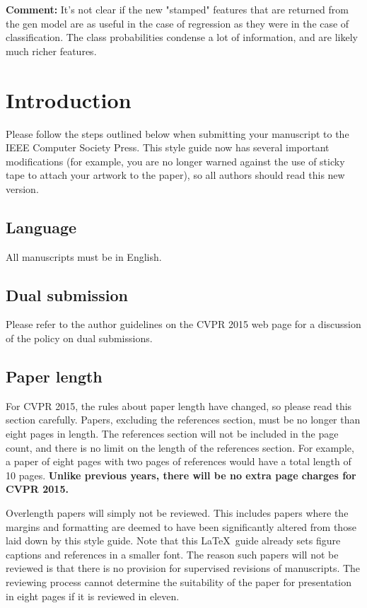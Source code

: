 \documentclass[10pt,twocolumn,letterpaper]{article}
\begin{document}
\textbf{Comment:} It's not clear if the new "stamped" features that are returned from the gen model are as useful in the case of regression as they were in the case of classification.  The class probabilities condense a lot of information, and are likely much richer features.









\section{Introduction}

Please follow the steps outlined below when submitting your manuscript to
the IEEE Computer Society Press.  This style guide now has several
important modifications (for example, you are no longer warned against the
use of sticky tape to attach your artwork to the paper), so all authors
should read this new version.

\subsection{Language}

All manuscripts must be in English.

\subsection{Dual submission}

Please refer to the author guidelines on the CVPR 2015 web page for a
discussion of the policy on dual submissions.

\subsection{Paper length}
For CVPR 2015, the rules about paper length have changed, so please
read this section carefully. Papers, excluding the references section,
must be no longer than eight pages in length. The references section
will not be included in the page count, and there is no limit on the
length of the references section. For example, a paper of eight pages
with two pages of references would have a total length of 10 pages.
{\bf Unlike previous years, there will be no extra page charges for
  CVPR 2015.}

Overlength papers will simply not be reviewed.  This includes papers
where the margins and formatting are deemed to have been significantly
altered from those laid down by this style guide.  Note that this
\LaTeX\ guide already sets figure captions and references in a smaller font.
The reason such papers will not be reviewed is that there is no provision for
supervised revisions of manuscripts.  The reviewing process cannot determine
the suitability of the paper for presentation in eight pages if it is
reviewed in eleven.  
\end{document}
